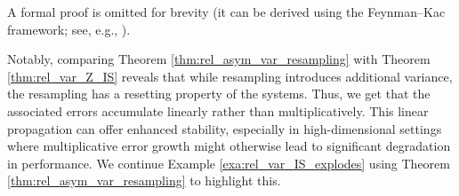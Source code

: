 A formal proof is omitted for brevity (it can be derived using the Feynman–Kac framework; see, e.g., \cite{moral2004feynman}). 

Notably, comparing Theorem \ref{thm:rel_asym_var_resampling} with Theorem \ref{thm:rel_var_Z_IS} reveals that while resampling introduces additional variance, the resampling has a resetting property of the systems. Thus, we get that the associated errors accumulate linearly rather than multiplicatively. This linear propagation can offer enhanced stability, especially in high-dimensional settings where multiplicative error growth might otherwise lead to significant degradation in performance. We continue Example \ref{exa:rel_var_IS_explodes} using Theorem \ref{thm:rel_asym_var_resampling} to highlight this.
\begin{comment}
	Below we provide a proof sketch, where the handling of error propagation is ignored.
	\begin{proof}[Proof sketch]
		We begin by writing the estimator \(\widehat{Z}_n\) as a product of the incremental estimators:
		\[
		\widehat{Z}_n = \widehat{Z}_1 \prod_{k=2}^n \widehat{\frac{Z_k}{Z_{k-1}}}.
		\]
		For notational convenience, define for \(k=1\)
		\[
		\widehat{A}_1 = \widehat{Z}_1,
		\]
		and for \(k\ge2\)
		\[
		\widehat{A}_k = \widehat{\frac{Z_k}{Z_{k-1}}},
		\]
		with the corresponding true values
		\[
		A_1 = Z_1,\quad \text{and for } k\ge2,\quad A_k = \frac{Z_k}{Z_{k-1}}.
		\]
		We now express each estimator in a \emph{relative error} form:
		\[
		\widehat{A}_k = A_k \, (1+\epsilon_k),
		\]
		where
		\[
		\epsilon_1 = \frac{\widehat{Z}_1-Z_1}{Z_1},\quad \text{and for } k\ge 2,\quad \epsilon_k = \frac{\widehat{\frac{Z_k}{Z_{k-1}}}-\frac{Z_k}{Z_{k-1}}}{\frac{Z_k}{Z_{k-1}}}.
		\]
		Thus, we can rewrite $\widehat{Z}_n$ as	
		\[
		\widehat{Z}_n = Z_1\prod_{k=2}^n \frac{Z_k}{Z_{k-1}} \prod_{k=1}^n (1+\epsilon_k) = Z_n \prod_{k=1}^n (1+\epsilon_k).
		\]
		Taking logarithms gives
		\[
		\log \widehat{Z}_n = \log Z_n + \sum_{k=1}^n \log (1+\epsilon_k).
		\]
		For small \(\epsilon_k\), we apply the first-order Taylor expansion
		\[
		\log (1+\epsilon_k) \approx \epsilon_k,
		\]
		so that
		\[
		\log \widehat{Z}_n \approx \log Z_n + \sum_{k=1}^n \epsilon_k.
		\]
		Ignoring the error propagation \(\epsilon_k\) we have that 
		\[
		\Var\Bigl(\log \widehat{Z}_n\Bigr) \approx \sum_{k=1}^n \Var(\epsilon_k).
		\]	
		At time \(k=1\), the IS estimator is 
		\[
		\widehat{Z}_1 = \frac{1}{N}\sum_{i=1}^N w_1^{(i)}, \quad \text{with } w_1(x_1)=\frac{\gamma_1(x_1)}{q_1(x_1)},
		\]
		and its variance is
		\[
		\Var_{\text{ISR}}[\widehat{Z}_1] = \frac{1}{N}\left(\int \frac{\gamma_1^2(x_1)}{q_1(x_1)}\,dx_1-Z_1^2\right)
		=\frac{Z_1^2}{N}\left(\int \frac{\pi_1^2(x_1)}{q_1(x_1)}\,dx_1-1\right).
		\]
		Since \(\epsilon_1 = (\widehat{Z}_1-Z_1)/Z_1\), it follows that
		\[
		\Var(\epsilon_1) = \frac{1}{N}\left(\int \frac{\pi_1^2(x_1)}{q_1(x_1)}\,dx_1-1\right).
		\]
		

\end{comment}
